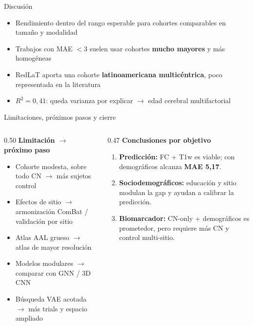 \documentclass[aspectratio=169, 11pt]{beamer}
\newcommand{\highlight}[1]{\textcolor{uncaccent}{\textbf{#1}}}
\begin{document}
\begin{frame}{Discusión}
  \begin{itemize}
    \item Rendimiento dentro del rango esperable para cohortes comparables en tamaño y modalidad

    \vspace{0.3cm}
    \item Trabajos con MAE $< 3$ suelen usar cohortes \textbf{mucho mayores} y más homogéneas

    \vspace{0.3cm}
    \item RedLaT aporta una cohorte \highlight{latinoamericana multicéntrica}, poco representada en la literatura

    \vspace{0.3cm}
    \item $R^2 = 0{,}41$: queda varianza por explicar $\rightarrow$ edad cerebral multifactorial
  \end{itemize}
\end{frame}

\begin{frame}[shrink=4]{Limitaciones, próximos pasos y cierre}
  \begin{columns}[T]
    \begin{column}{0.50\textwidth}
      \textbf{Limitación $\rightarrow$ próximo paso}
      \vspace{0.05cm}
      {\small
      \begin{itemize}\setlength{\itemsep}{2pt}
        \item Cohorte modesta, sobre todo CN $\rightarrow$ más sujetos control
        \item Efectos de sitio $\rightarrow$ armonización ComBat / validación por sitio
        \item Atlas AAL grueso $\rightarrow$ atlas de mayor resolución
        \item Modelos modulares $\rightarrow$ comparar con GNN / 3D CNN
        \item Búsqueda VAE acotada $\rightarrow$ más trials y espacio ampliado
      \end{itemize}}
    \end{column}
    \begin{column}{0.47\textwidth}
      \textbf{Conclusiones por objetivo}
      \vspace{0.05cm}
      {\small
      \begin{enumerate}\setlength{\itemsep}{5pt}
        \item \textbf{Predicción:} FC + T1w es viable; con demográficos alcanza \highlight{MAE 5,17}.
        \item \textbf{Sociodemográficos:} educación y sitio modulan la gap y ayudan a calibrar la predicción.
        \item \textbf{Biomarcador:} CN-only + demográficos es prometedor, pero requiere más CN y control multi-sitio.
      \end{enumerate}}
    \end{column}
  \end{columns}
\end{frame}
\end{document}
